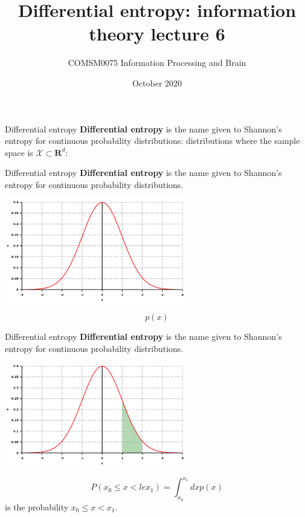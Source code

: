 \documentclass{beamer}
\title[Information Theory lecture 7]{Differential entropy: information theory lecture 6}
\author{COMSM0075 Information Processing and Brain}
\institute{\texttt{comsm0075.github.io}}
\date{October 2020}
\newcommand{\cgish}{\color{greenish}}
\newcommand{\cbla}{\color{black}}
\newcommand{\cred}{\color{red}}
\begin{document}
\maketitle


\begin{frame}{Differential entropy}
\textbf{Differential entropy} is the name given to Shannon's entropy
for continuous probability distributions: distributions where the sample space is $\mathcal{X}\subset \textbf{R}^d$:


  \end{frame}


\begin{frame}{Differential entropy}
\textbf{Differential entropy} is the name given to Shannon's entropy
for continuous probability distributions.
\begin{center}
  \includegraphics[width=8cm]{Gauss.svg.png}
\end{center}
\cred
$$
p(x)
$$
\cbla
\vfill
{}
  \end{frame}


\begin{frame}{Differential entropy}
\textbf{Differential entropy} is the name given to Shannon's entropy
for continuous probability distributions.
\begin{center}
  \includegraphics[width=8cm]{Gauss_area.png}
\end{center}
\cgish
  $$P(x_0\le x<le x_1)=\int_{x_0}^{x_1}dx p(x)$$\cbla{} is the probability\cgish{} $x_0\le x< x_1$.
\cbla
\vfill
{}
  \end{frame}
\end{document}
